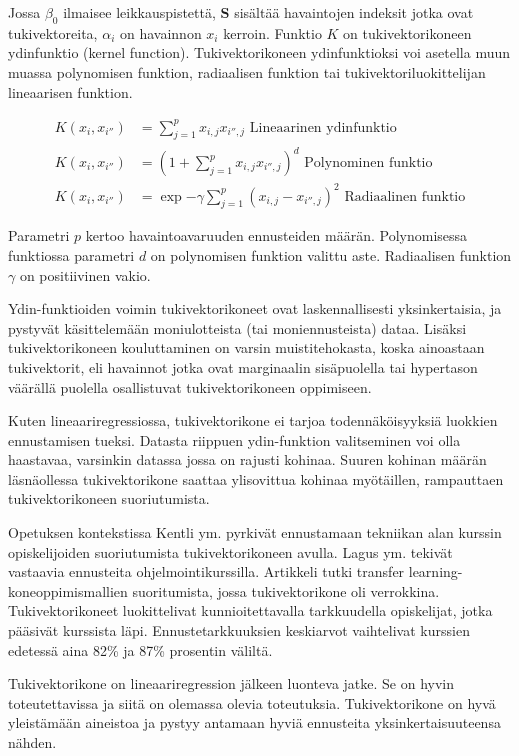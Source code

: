 \documentclass[finnish,twoside,openright]{HYgraduMLDS}
\begin{document}
Jossa $\beta_0$ ilmaisee leikkauspistettä, $\textbf{S}$ sisältää havaintojen indeksit jotka ovat tukivektoreita, $\alpha_i$ on havainnon $x_i$ kerroin. Funktio $K$ on tukivektorikoneen ydinfunktio (kernel function). Tukivektorikoneen ydinfunktioksi voi asetella muun muassa polynomisen funktion, radiaalisen funktion tai tukivektoriluokittelijan lineaarisen funktion.

\begin{align}
    K(x_i, x_{i''}) &= \sum^p_{j=1} x_{i, j} x_{i'', j} \text{ Lineaarinen ydinfunktio}\\
    K(x_i, x_{i''}) &= (1 + \sum^p_{j=1} x_{i, j} x_{i'', j} )^d \text{ Polynominen funktio}\\
    K(x_i, x_{i''}) &= \exp{-\gamma \sum^p_{j=1}( x_{i, j} - x_{i'', j} )^2} \text{ Radiaalinen funktio}
\end{align}

Parametri $p$ kertoo havaintoavaruuden ennusteiden määrän. Polynomisessa funktiossa parametri $d$ on polynomisen funktion valittu aste. Radiaalisen funktion $\gamma$ on positiivinen vakio.

Ydin-funktioiden voimin tukivektorikoneet ovat laskennallisesti yksinkertaisia, ja pystyvät käsittelemään moniulotteista (tai moniennusteista) dataa. Lisäksi tukivektorikoneen kouluttaminen on varsin muistitehokasta, koska ainoastaan tukivektorit, eli havainnot jotka ovat marginaalin sisäpuolella tai hypertason väärällä puolella osallistuvat tukivektorikoneen oppimiseen. 

Kuten lineaariregressiossa, tukivektorikone ei tarjoa todennäköisyyksiä luokkien ennustamisen tueksi. Datasta riippuen ydin-funktion valitseminen voi olla haastavaa, varsinkin datassa jossa on rajusti kohinaa. Suuren kohinan määrän läsnäollessa tukivektorikone saattaa ylisovittua kohinaa myötäillen, rampauttaen tukivektorikoneen suoriutumista.

Opetuksen kontekstissa Kentli ym. \cite{kentli2011svm} pyrkivät ennustamaan tekniikan alan kurssin opiskelijoiden suoriutumista tukivektorikoneen avulla. Lagus ym. \cite{lagus2018transfer} tekivät vastaavia ennusteita ohjelmointikurssilla. Artikkeli \cite{lagus2018transfer} tutki transfer learning-koneoppimismallien suoritumista, jossa tukivektorikone oli verrokkina. Tukivektorikoneet luokittelivat kunnioitettavalla tarkkuudella opiskelijat, jotka pääsivät kurssista läpi. Ennustetarkkuuksien keskiarvot vaihtelivat kurssien edetessä aina 82\% ja 87\% prosentin väliltä.

Tukivektorikone on lineaariregression jälkeen luonteva jatke. Se on hyvin toteutettavissa ja siitä on olemassa olevia toteutuksia. Tukivektorikone on hyvä yleistämään aineistoa ja pystyy antamaan hyviä ennusteita yksinkertaisuuteensa nähden.
\end{document}
